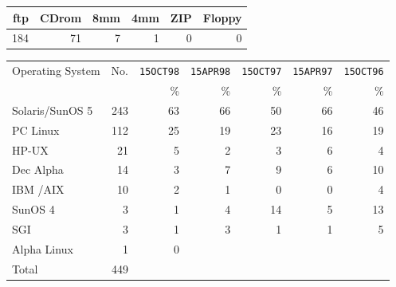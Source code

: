 \begin{center}
\begin{tabular}{|r|r|r|r|r|r|} \hline\hline
{ftp} & {CDrom} &{8mm} & {4mm} & {ZIP} & {Floppy} \\ \hline
184   &      71 &   7  &    1  &    0  &       0  \\ \hline\hline
\end{tabular}
\end{center}

\begin{center}
\begin{tabular}{|l|r|r|r|r|r|r|} \hline\hline
{Operating System} & {No.} & \texttt{15OCT98}
                           & \texttt{15APR98}  & \texttt{15OCT97}
                           & \texttt{15APR97}  & \texttt{15OCT96} \\
                &          & {\%} & {\%} & {\%} & {\%} & {\%} \\
\hline
Solaris/SunOS 5 &    243   & 63 & 66 & 50 & 66 & 46  \\
PC Linux        &    112   & 25 & 19 & 23 & 16 & 19  \\
HP-UX           &     21   &  5 &  2 &  3 &  6 &  4  \\
Dec Alpha       &     14   &  3 &  7 &  9 &  6 & 10  \\
IBM /AIX        &     10   &  2 &  1 &  0 &  0 &  4  \\
SunOS 4         &      3   &  1 &  4 & 14 &  5 & 13  \\
SGI             &      3   &  1 &  3 &  1 &  1 &  5  \\
Alpha Linux     &      1   &  0 &    &    &    &     \\
Total           &    449   &    &    &    &    &     \\
\hline\hline
\end{tabular}
\end{center}


